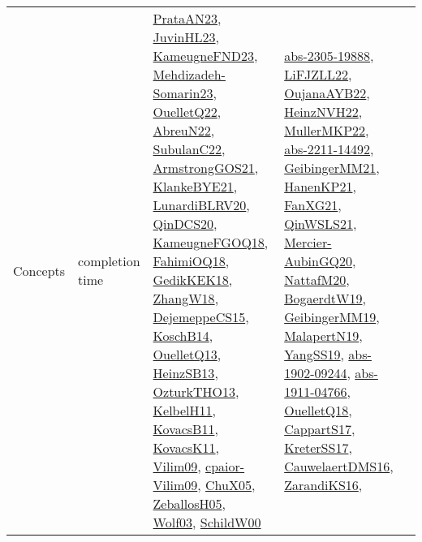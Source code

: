 {\begin{longtable}{llp{6cm}p{6cm}p{6cm}}
Concepts & completion time & \href{articles/PrataAN23.pdf}{PrataAN23}\cite{PrataAN23}, \href{papers/JuvinHL23.pdf}{JuvinHL23}\cite{JuvinHL23}, \href{papers/KameugneFND23.pdf}{KameugneFND23}\cite{KameugneFND23}, \href{papers/Mehdizadeh-Somarin23.pdf}{Mehdizadeh-Somarin23}\cite{Mehdizadeh-Somarin23}, \href{papers/OuelletQ22.pdf}{OuelletQ22}\cite{OuelletQ22}, \href{articles/AbreuN22.pdf}{AbreuN22}\cite{AbreuN22}, \href{articles/SubulanC22.pdf}{SubulanC22}\cite{SubulanC22}, \href{papers/ArmstrongGOS21.pdf}{ArmstrongGOS21}\cite{ArmstrongGOS21}, \href{papers/KlankeBYE21.pdf}{KlankeBYE21}\cite{KlankeBYE21}, \href{articles/LunardiBLRV20.pdf}{LunardiBLRV20}\cite{LunardiBLRV20}, \href{articles/QinDCS20.pdf}{QinDCS20}\cite{QinDCS20}, \href{papers/KameugneFGOQ18.pdf}{KameugneFGOQ18}\cite{KameugneFGOQ18}, \href{articles/FahimiOQ18.pdf}{FahimiOQ18}\cite{FahimiOQ18}, \href{articles/GedikKEK18.pdf}{GedikKEK18}\cite{GedikKEK18}, \href{articles/ZhangW18.pdf}{ZhangW18}\cite{ZhangW18}, \href{papers/DejemeppeCS15.pdf}{DejemeppeCS15}\cite{DejemeppeCS15}, \href{papers/KoschB14.pdf}{KoschB14}\cite{KoschB14}, \href{papers/OuelletQ13.pdf}{OuelletQ13}\cite{OuelletQ13}, \href{articles/HeinzSB13.pdf}{HeinzSB13}\cite{HeinzSB13}, \href{articles/OzturkTHO13.pdf}{OzturkTHO13}\cite{OzturkTHO13}, \href{articles/KelbelH11.pdf}{KelbelH11}\cite{KelbelH11}, \href{articles/KovacsB11.pdf}{KovacsB11}\cite{KovacsB11}, \href{articles/KovacsK11.pdf}{KovacsK11}\cite{KovacsK11}, \href{papers/Vilim09.pdf}{Vilim09}\cite{Vilim09}, \href{papers/cpaior-Vilim09.pdf}{cpaior-Vilim09}\cite{cpaior-Vilim09}, \href{papers/ChuX05.pdf}{ChuX05}\cite{ChuX05}, \href{articles/ZeballosH05.pdf}{ZeballosH05}\cite{ZeballosH05}, \href{papers/Wolf03.pdf}{Wolf03}\cite{Wolf03}, \href{articles/SchildW00.pdf}{SchildW00}\cite{SchildW00} & \href{articles/abs-2305-19888.pdf}{abs-2305-19888}\cite{abs-2305-19888}, \href{papers/LiFJZLL22.pdf}{LiFJZLL22}\cite{LiFJZLL22}, \href{papers/OujanaAYB22.pdf}{OujanaAYB22}\cite{OujanaAYB22}, \href{articles/HeinzNVH22.pdf}{HeinzNVH22}\cite{HeinzNVH22}, \href{articles/MullerMKP22.pdf}{MullerMKP22}\cite{MullerMKP22}, \href{articles/abs-2211-14492.pdf}{abs-2211-14492}\cite{abs-2211-14492}, \href{papers/GeibingerMM21.pdf}{GeibingerMM21}\cite{GeibingerMM21}, \href{papers/HanenKP21.pdf}{HanenKP21}\cite{HanenKP21}, \href{articles/FanXG21.pdf}{FanXG21}\cite{FanXG21}, \href{articles/QinWSLS21.pdf}{QinWSLS21}\cite{QinWSLS21}, \href{papers/Mercier-AubinGQ20.pdf}{Mercier-AubinGQ20}\cite{Mercier-AubinGQ20}, \href{papers/NattafM20.pdf}{NattafM20}\cite{NattafM20}, \href{papers/BogaerdtW19.pdf}{BogaerdtW19}\cite{BogaerdtW19}, \href{papers/GeibingerMM19.pdf}{GeibingerMM19}\cite{GeibingerMM19}, \href{papers/MalapertN19.pdf}{MalapertN19}\cite{MalapertN19}, \href{papers/YangSS19.pdf}{YangSS19}\cite{YangSS19}, \href{articles/abs-1902-09244.pdf}{abs-1902-09244}\cite{abs-1902-09244}, \href{articles/abs-1911-04766.pdf}{abs-1911-04766}\cite{abs-1911-04766}, \href{papers/OuelletQ18.pdf}{OuelletQ18}\cite{OuelletQ18}, \href{papers/CappartS17.pdf}{CappartS17}\cite{CappartS17}, \href{articles/KreterSS17.pdf}{KreterSS17}\cite{KreterSS17}, \href{papers/CauwelaertDMS16.pdf}{CauwelaertDMS16}\cite{CauwelaertDMS16}, \href{articles/ZarandiKS16.pdf}{ZarandiKS16}\cite{ZarandiKS16}, 
\end{longtable}}
